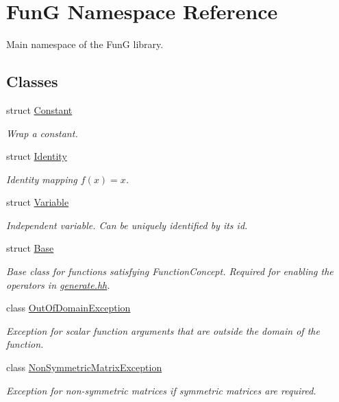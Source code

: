 \hypertarget{namespaceFunG}{\section{Fun\-G Namespace Reference}
\label{namespaceFunG}
}


Main namespace of the Fun\-G library.  


\subsection*{Classes}
\begin{DoxyCompactItemize}
\item 
struct \hyperlink{structFunG_1_1Constant}{Constant}
\begin{DoxyCompactList}\small\item\em Wrap a constant. \end{DoxyCompactList}\item 
struct \hyperlink{structFunG_1_1Identity}{Identity}
\begin{DoxyCompactList}\small\item\em Identity mapping $ f(x)=x $. \end{DoxyCompactList}\item 
struct \hyperlink{structFunG_1_1Variable}{Variable}
\begin{DoxyCompactList}\small\item\em Independent variable. Can be uniquely identified by its id. \end{DoxyCompactList}\item 
struct \hyperlink{structFunG_1_1Base}{Base}
\begin{DoxyCompactList}\small\item\em Base class for functions satisfying Function\-Concept. Required for enabling the operators in \hyperlink{generate_8hh_source}{generate.\-hh}. \end{DoxyCompactList}\item 
class \hyperlink{classFunG_1_1OutOfDomainException}{Out\-Of\-Domain\-Exception}
\begin{DoxyCompactList}\small\item\em Exception for scalar function arguments that are outside the domain of the function. \end{DoxyCompactList}\item 
class \hyperlink{classFunG_1_1NonSymmetricMatrixException}{Non\-Symmetric\-Matrix\-Exception}
\begin{DoxyCompactList}\small\item\em Exception for non-\/symmetric matrices if symmetric matrices are required. \end{DoxyCompactList}\item 

\end{DoxyCompactItemize}
